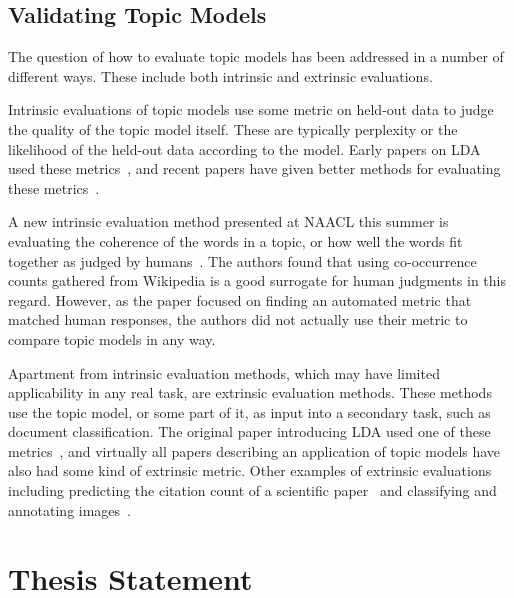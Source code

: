 \documentclass[ms]{byuprop}
\begin{document}
\subsection{Validating Topic Models}

The question of how to evaluate topic models has been addressed in a number of
different ways.  These include both intrinsic and extrinsic evaluations.

Intrinsic evaluations of topic models use some metric on held-out data to judge
the quality of the topic model itself.  These are typically perplexity or the
likelihood of the held-out data according to the model.  Early papers on LDA
used these metrics~\cite{blei-2003-latent-dirichlet-allocation,
griffiths-2004-finding-scientific-topics}, and recent papers have given better
methods for evaluating these
metrics~\cite{wallach-2009-evaluation-for-topic-models,
buntine-2009-estimating-likelihoods-for-topic-models}.

A new intrinsic evaluation method presented at NAACL this summer is evaluating
the coherence of the words in a topic, or how well the words fit together as
judged by humans~\cite{newman-2010-automatic-evaluation-of-topic-coherence}.
The authors found that using co-occurrence counts gathered from Wikipedia is a
good surrogate for human judgments in this regard.  However, as the paper
focused on finding an automated metric that matched human responses, the
authors did not actually use their metric to compare topic models in any way.

Apartment from intrinsic evaluation methods, which may have limited
applicability in any real task, are extrinsic evaluation methods.  These
methods use the topic model, or some part of it, as input into a secondary
task, such as document classification.  The original paper introducing LDA used
one of these metrics~\cite{blei-2003-latent-dirichlet-allocation}, and
virtually all papers describing an application of topic models have also had
some kind of extrinsic metric.  Other examples of extrinsic evaluations
including predicting the citation count of a scientific
paper~\cite{gerrish-2010-measuring-scholarly-impact} and classifying and
annotating images~\cite{wang-2009-image-classification-annotation}.


\section{Thesis Statement}
\end{document}
